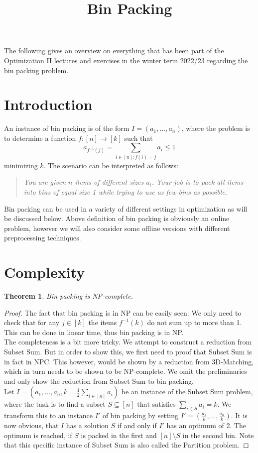 \documentclass[a4paper, 12pt]{article}
\newtheorem{theorem}{Theorem}[section]
\begin{document}
	\begin{titlepage} 
		\title{Bin Packing}
		\clearpage\maketitle
		\thispagestyle{empty}
	\end{titlepage}
	The following gives an overview on everything that has been part of the Optimization II lectures and exercises in the winter term 2022/23 regarding the bin packing problem.
	\section{Introduction}
	An instance of bin packing is of the form $I = (a_1,...,a_n)$, where the problem is to determine a function $f: [n] \to [k]$ such that \[a_{f^{-1}(j)} = \sum_{i \in [n]: f(i) = j} a_i \leq 1\] minimizing $k$. The scenario can be interpreted as follows: \begin{quote}
		\textit{You are given $n$ items of different sizes $a_i$. Your job is to pack all items into bins of equal size 1 while trying to use as few bins as possible.}
	\end{quote}
	Bin packing can be used in a variety of different settings in optimization as will be discussed below. Above definition of bin packing is obviously an online problem, however we will also consider some offline versions with different preprocessing techniques. 
	\section{Complexity}
	\begin{theorem}
		Bin packing is NP-complete.
	\end{theorem}
	\begin{proof}
		The fact that bin packing is in NP can be easily seen: We only need to check that for any $j \in [k]$ the items $f^{-1}(k)$ do not sum up to more than 1. This can be done in linear time, thus bin packing is in NP.\\
		The completeness is a bit more tricky. We attempt to construct a reduction from Subset Sum. But in order to show this, we first need to proof that Subset Sum is in fact in NPC. This however, would be shown by a reduction from 3D-Matching, which in turn needs to be shown to be NP-complete. We omit the preliminaries and only show the reduction from Subset Sum to bin packing.\\
		
		Let $I = (a_1,...,a_n, k=\frac{1}{2}\sum_{i \in [n]} a_i)$ be an instance of the Subset Sum problem, where the task is to find a subset $S \subseteq [n]$ that satisfies $\sum_{i \in S} a_i = k$. We transform this to an instance $I'$ of bin packing by setting $I' = (\frac{a_1}{k},...,\frac{a_n}{k})$. It is now obvious, that $I$ has a solution $S$ if and only if $I'$ has an optimum of 2. The optimum is reached, if $S$ is packed in the first and $[n]\setminus S$ in the second bin. Note that this specific instance of Subset Sum is also called the Partition problem.
	\end{proof}
\end{document}
